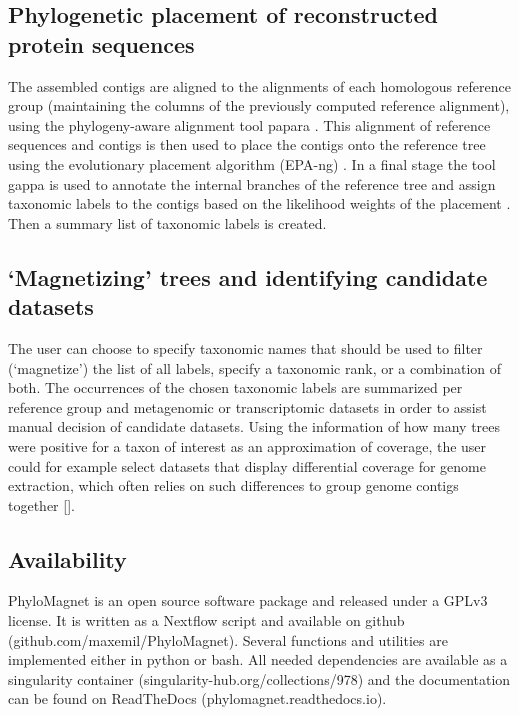 \documentclass{bioinfo}
\begin{document}
\begin{methods}
\subsection{Phylogenetic placement of reconstructed protein sequences}
The assembled contigs are aligned to the alignments of each homologous reference group (maintaining the columns of the previously computed reference alignment), using the phylogeny-aware alignment tool papara \citep{Berger2011a}. This alignment of reference sequences and contigs is then used to place the contigs onto the reference tree using the evolutionary placement algorithm (EPA-ng) \citep{Berger2011b,Barbera2019}. In a final stage the tool gappa is used to annotate the internal branches of the reference tree and assign taxonomic labels to the contigs based on the likelihood weights of the placement \citep{Czech2018}. Then a summary list of taxonomic labels is created.

\subsection{‘Magnetizing’ trees and identifying candidate datasets}
The user can choose to specify taxonomic names that should be used to filter (‘magnetize’) the list of all labels, specify a taxonomic rank, or a combination of both. The occurrences of the chosen taxonomic labels are summarized per reference group and metagenomic or transcriptomic datasets  in order to assist manual decision of candidate datasets. Using the information of how many trees were positive for a taxon of interest as an approximation of coverage, the user could for example select datasets that display differential coverage for genome extraction, which often relies on such differences to group genome contigs together []. 

\subsection{Availability}
PhyloMagnet is an open source software package and released under a GPLv3 license. It is written as a Nextflow \citep{DiTommaso2017} script and available on github (github.com/maxemil/PhyloMagnet). Several functions and utilities are implemented either in python or bash. All needed dependencies are available as a singularity \citep{Kurtzer2017} container (singularity-hub.org/collections/978) and the documentation can be found on ReadTheDocs (phylomagnet.readthedocs.io).


\end{methods}
\end{document}
